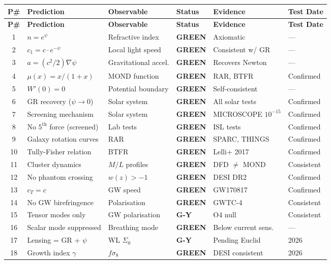 \documentclass[11pt,a4paper]{article}
\newcommand{\GREEN}{\textcolor{dfdgreen}{\textbf{GREEN}}}
\newcommand{\GY}{\textcolor{dfdgy}{\textbf{G-Y}}}
\begin{document}
\begin{center}
\begin{longtable}{clp{4.5cm}lll}
\toprule
\textbf{P\#} & \textbf{Prediction} & \textbf{Observable} & \textbf{Status} & \textbf{Evidence} & \textbf{Test Date} \\
\midrule
\endfirsthead
\toprule
\textbf{P\#} & \textbf{Prediction} & \textbf{Observable} & \textbf{Status} & \textbf{Evidence} & \textbf{Test Date} \\
\midrule
\endhead
1 & $n = e^\psi$ & Refractive index & \GREEN & Axiomatic & --- \\
2 & $c_1 = c \cdot e^{-\psi}$ & Local light speed & \GREEN & Consistent w/ GR & --- \\
3 & $a = (c^2/2)\nabla\psi$ & Gravitational accel. & \GREEN & Recovers Newton & --- \\
4 & $\mu(x) = x/(1+x)$ & MOND function & \GREEN & RAR, BTFR & Confirmed \\
5 & $W'(0) = 0$ & Potential boundary & \GREEN & Self-consistent & --- \\
6 & GR recovery ($\psi \to 0$) & Solar system & \GREEN & All solar tests & Confirmed \\
7 & Screening mechanism & Solar system & \GREEN & MICROSCOPE $10^{-15}$ & Confirmed \\
8 & No $5^\mathrm{th}$ force (screened) & Lab tests & \GREEN & ISL tests & Confirmed \\
9 & Galaxy rotation curves & RAR & \GREEN & SPARC, THINGS & Confirmed \\
10 & Tully-Fisher relation & BTFR & \GREEN & Lelli+ 2017 & Confirmed \\
11 & Cluster dynamics & $M/L$ profiles & \GREEN & DFD $\neq$ MOND & Consistent \\
12 & No phantom crossing & $w(z) > -1$ & \GREEN & DESI DR2 & Confirmed \\
13 & $c_T = c$ & GW speed & \GREEN & GW170817 & Confirmed \\
14 & No GW birefringence & Polarisation & \GREEN & GWTC-4 & Consistent \\
15 & Tensor modes only & GW polarisation & \GY & O4 null & Consistent \\
16 & Scalar mode suppressed & Breathing mode & \GREEN & Below current sens. & --- \\
17 & Lensing = GR + $\psi$ & WL $\Sigma_0$ & \GY & Pending Euclid & 2026 \\
18 & Growth index $\gamma$ & $f\sigma_8$ & \GREEN & DESI consistent & 2026 \\

\end{longtable}
\end{center}
\end{document}
